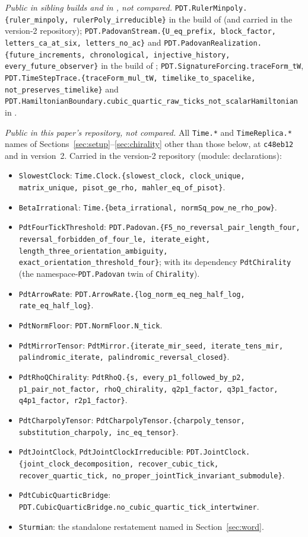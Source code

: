 \documentclass[11pt]{amsart}
\theoremstyle{plain}
\theoremstyle{definition}
\theoremstyle{remark}
\begin{document}
\emph{Public in sibling builds and in \cite{pdtlean}, not compared.}
\texttt{PDT.RulerMinpoly.\{ruler\_minpoly, rulerPoly\_irreducible\}} in the build of
\cite{palomar-compositum} (and carried in the version-2 repository);
\texttt{PDT.PadovanStream.\{U\_eq\_prefix, block\_factor,
letters\_ca\_at\_six, letters\_no\_ac\}} and \texttt{PDT.PadovanRealization.\{future\_increments,
chronological, injective\_history, every\_future\_observer\}} in the build of
\cite{palomar-cph}; \texttt{PDT.SignatureForcing.traceForm\_tW},
\texttt{PDT.TimeStepTrace.\{traceForm\_mul\_tW, timelike\_to\_spacelike,
not\_preserves\_timelike\}} and
\texttt{PDT.HamiltonianBoundary.cubic\_quartic\_raw\_ticks\_not\_scalarHamiltonian} in
\cite{pdtlean}.

\emph{Public in this paper's repository, not compared.} All \texttt{Time.*} and
\texttt{TimeReplica.*} names of Sections~\ref{sec:setup}--\ref{sec:chirality} other than those
below, at \texttt{c48eb12} and in version~2. Carried in the version-2 repository (module:
declarations):
\begin{itemize}
\item \texttt{SlowestClock}: \texttt{Time.Clock.\{slowest\_clock, clock\_unique, matrix\_unique,
pisot\_ge\_rho, mahler\_eq\_of\_pisot\}}.
\item \texttt{BetaIrrational}: \texttt{Time.\{beta\_irrational, normSq\_pow\_ne\_rho\_pow\}}.
\item \texttt{PdtFourTickThreshold}: \texttt{PDT.Padovan.\{F5\_no\_reversal\_pair\_length\_four,
reversal\_forbidden\_of\_four\_le, iterate\_eight, length\_three\_orientation\_ambiguity,
exact\_orientation\_threshold\_four\}};
with its dependency \texttt{PdtChirality} (the namespace-\texttt{PDT.Padovan} twin of
\texttt{Chirality}).
\item \texttt{PdtArrowRate}: \texttt{PDT.ArrowRate.\{log\_norm\_eq\_neg\_half\_log,
rate\_eq\_half\_log\}}.
\item \texttt{PdtNormFloor}: \texttt{PDT.NormFloor.N\_tick}.
\item \texttt{PdtMirrorTensor}: \texttt{PdtMirror.\{iterate\_mir\_seed, iterate\_tens\_mir,
palindromic\_iterate, palindromic\_reversal\_closed\}}.
\item \texttt{PdtRhoQChirality}: \texttt{PdtRhoQ.\{s, every\_p1\_followed\_by\_p2,
p1\_pair\_not\_factor, rhoQ\_chirality, q2p1\_factor, q3p1\_factor, q4p1\_factor,
r2p1\_factor\}}.
\item \texttt{PdtCharpolyTensor}: \texttt{PdtCharpolyTensor.\{charpoly\_tensor,
substitution\_charpoly, inc\_eq\_tensor\}}.
\item \texttt{PdtJointClock}, \texttt{PdtJointClockIrreducible}:
\texttt{PDT.JointClock.\{joint\_clock\_decomposition, recover\_cubic\_tick,
recover\_quartic\_tick, no\_proper\_jointTick\_invariant\_submodule\}}.
\item \texttt{PdtCubicQuarticBridge}:
\texttt{PDT.CubicQuarticBridge.no\_cubic\_quartic\_tick\_intertwiner}.
\item \texttt{Sturmian}: the standalone restatement named in Section~\ref{sec:word}.
\end{itemize}
\end{document}
